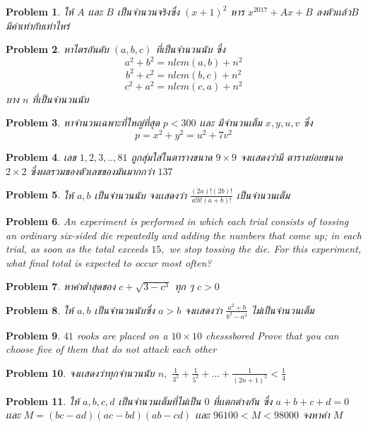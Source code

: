 \documentclass[a4paper,12pt]{article}
\newtheorem{problem}{Problem}
\begin{document}
	\begin{problem}
		ให้ $A$ เเละ $B$ เป็นจำนวนจริงซึ่ง $(x+1)^2$ หาร $x^{2017}+Ax+B$ ลงตัวเเล้ว$B$มีค่าเท่ากับเท่าไหร่
	\end{problem}
	\begin{problem}
		หาไตรอันดับ $(a,b,c)$ ที่เป็นจำนวนนับ ซึ่ง $$a^2+b^2=nlcm(a,b)+n^2$$ $$b^2+c^2=nlcm(b,c)+n^2$$ $$c^2+a^2=nlcm(c,a)+n^2$$ บาง $n$ ที่เป็นจำนวนนับ
	\end{problem}
	\begin{problem}
		หาจำนวนเฉพาะที่ใหญ่ที่สุด $p<300$ เเละ มีจำนวนเต็ม $x,y,u,v$ ซึ่ง $$p=x^2+y^2=u^2+7v^2$$
	\end{problem}
	\begin{problem}
		เลข $1,2,3,..,81$ ถูกสุ่มใส่ในตารางขนาด $9\times9$ จงเเสดงว่ามี ตารางย่อยขนาด $2\times2$ ซึ่งผลรวมของตัวเลขของมันมากกว่า $137$
	\end{problem}
	\begin{problem}
	ให้ $a, b$ เป็นจำนวนนับ จงเเสดงว่า $\frac{(2a)!(2b)!}{a!b!(a+b)!}$ เป็นจำนวนเต็ม
	\end{problem}
	\begin{problem}
		An experiment is performed in which each trial consists of tossing an ordinary six-sided die repeatedly and adding the numbers that come up; in each trial, as soon as the total exceeds $15,$ we stop tossing the die. For this experiment, what final total is expected to occur most often?
	\end{problem}
	\begin{problem}
		หาค่าต่ำสุดของ $c + \sqrt{3-c^3}$ ทุก ๆ $c>0$
	\end{problem}
	\begin{problem}
		ให้ $a, b$ เป็นจำนวนนับซึ่ง $a>b$ จงเเสดงว่า $\frac{a^2+b}{b^2-a^3}$ ไม่เป็นจำนวนเต็ม
	\end{problem}
	\begin{problem}
		$41$ rooks are placed on  a $10×10$ chesssbored Prove that you can choose five of them that do not attack each other
	\end{problem}
	\begin{problem}
		จงเเสดงว่าทุกจำนวนนับ $n,$ $\frac{1}{3^2}+\frac{1}{5^2}+...+\frac{1}{(2n+1)^2} < \frac{1}{4}$ 
	\end{problem}
	\begin{problem}
		ให้ $a,b,c,d$ เป็นจำนวนเต็มที่ไม่เป็น $0$ ที่เเตกต่างกัน ซึ่ง $a+b+c+d=0$ เเละ $M=(bc-ad)(ac-bd)(ab-cd)$ เเละ $96100<M<98000$ จงหาค่า $M$
	\end{problem}
\end{document}
